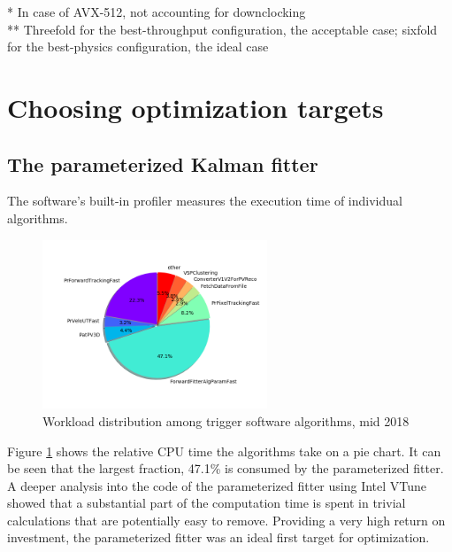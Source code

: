 \documentclass[12pt]{article}
\newcommand\tab[1][.7cm]{\hspace*{#1}}
\begin{document}
\vspace{1pc}
\small
\noindent\tab* In case of AVX-512, not accounting for downclocking\\
\noindent\tab** Threefold for the best-throughput configuration, the acceptable case; sixfold for the best-physics configuration, the ideal case
\normalsize


\newpage
\section{Choosing optimization targets}

\subsection{The parameterized Kalman fitter}

The software's built-in profiler measures the execution time of individual algorithms.

\begin{figure}[H]
	\begin{center}
		\includegraphics[width=0.6\textwidth]{algo_usage_original_bestphys}
	\end{center}
	\caption{Workload distribution among trigger software algorithms, mid 2018}
	\label{fig_algo_usage_choice}
\end{figure}

Figure \ref{fig_algo_usage_choice} shows the relative CPU time the algorithms take on a pie chart. It can be seen that the largest fraction, 47.1\% is consumed by the parameterized fitter. A deeper analysis into the code of the parameterized fitter using Intel VTune showed that a substantial part of the computation time is spent in trivial calculations that are potentially easy to remove. Providing a very high return on investment, the parameterized fitter was an ideal first target for optimization.
\end{document}

